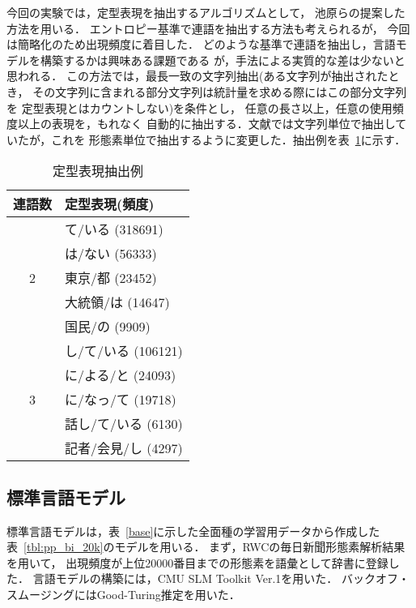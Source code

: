 今回の実験では，定型表現を抽出するアルゴリズムとして，
池原らの提案した方法\cite{test21}を用いる．
エントロピー基準で連語を抽出する方法も考えられるが\cite{test11,test12,test23}，
今回は簡略化のため出現頻度に着目した．
どのような基準で連語を抽出し，言語モデルを構築するかは興味ある課題である
が，手法による実質的な差は少ないと思われる\cite{nakagawa}．
この方法では，最長一致の文字列抽出(ある文字列が抽出されたとき，
その文字列に含まれる部分文字列は統計量を求める際にはこの部分文字列を
定型表現とはカウントしない)を条件とし，
任意の長さ以上，任意の使用頻度以上の表現を，もれなく
自動的に抽出する．文献\cite{test21}では文字列単位で抽出していたが，これを
\mbox{形態素単位で}抽出するように変更した．抽出例を表~\ref{rei}に示す．

\vspace*{-5mm}

\begin{table}[htbp]
\centering
\caption{定型表現抽出例}
\label{rei}
\begin{tabular}{|c|l|} \hline
連語数 & 定型表現(頻度) \\ \hline
       & て/いる (318691) \\
       & は/ない (56333) \\
2      & 東京/都 (23452) \\
       & 大統領/は (14647) \\
       & 国民/の (9909) \\ \hline
      & し/て/いる (106121) \\
       & に/よる/と (24093) \\
3       & に/なっ/て (19718) \\
       & 話し/て/いる (6130) \\
       & 記者/会見/し (4297) \\ \hline
\end{tabular}
\end{table}



\subsection{標準言語モデル}

標準言語モデルは，表~\ref{base}に示した全面種の学習用データから作成した
表~\ref{tbl:pp_bi_20k}のモデルを用いる．
まず，RWC\cite{test22}の毎日新聞形態素解析結果を用いて，
出現頻度が上位20000番目までの形態素を語彙として辞書に登録した．
言語モデルの構築には，CMU SLM Toolkit Ver.1を用いた．
バックオフ・スムージングにはGood-Turing推定を用いた．


